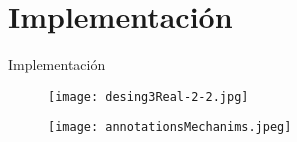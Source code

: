 \section{Implementación}
\begin{frame}{Implementación}
\begin{figure}[t!]
	\begin{center} 
	\texttt{[image: desing3Real-2-2.jpg]} 
	\end{center}
\end{figure}
\pause
{}
\begin{figure}[t!]
	\begin{center} 
	\texttt{[image: annotationsMechanims.jpeg]}
	\end{center}
\end{figure}
\end{frame}